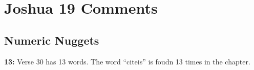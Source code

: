 \section{Joshua 19 Comments}

\subsection{Numeric Nuggets}
\textbf{13: } Verse 30 has 13 words. The word ``citeis'' is foudn 13 times in the chapter.

